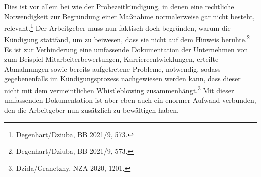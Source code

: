 Dies ist vor allem bei wie der Probezeitkündigung, in denen eine rechtliche Notwendigkeit zur Begründung einer Maßnahme normalerweise gar nicht besteht, relevant.\footnote{Degenhart/Dziuba, BB 2021/9, 573.}
Der Arbeitgeber muss nun faktisch doch begründen, warum die Kündigung stattfand, um zu beiwesen, dass sie nicht auf dem Hinweis beruhte.\footnote{Degenhart/Dziuba, BB 2021/9, 573.}
Es ist zur Verhinderung eine umfassende Dokumentation der Unternehmen von zum Beispiel Mitarbeiterbewertungen, Karriereentwicklungen, erteilte Abmahnungen sowie bereits aufgetretene Probleme, notwendig, sodass gegebenenfalls im Kündigungsprozess nachgewiesen werden kann, dass dieser nicht mit dem vermeintlichen Whistleblowing zusammenhängt.\footnote{Dzida/Granetzny, NZA 2020, 1201.}
Mit dieser umfassenden Dokumentation ist aber eben auch ein enormer Aufwand verbunden, den die Arbeitgeber nun zusätzlich zu bewältigen haben.



